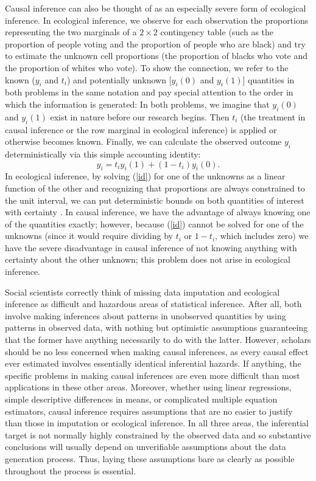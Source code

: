 \documentclass[11pt,titlepage]{article}
\begin{document}
Causal inference can also be thought of as an especially severe form
of ecological inference.  In ecological inference, we observe for each
observation the proportions representing the two marginals of a
$2\times 2$ contingency table (such as the proportion of people voting
and the proportion of people who are black) and try to estimate the
unknown cell proportions (the proportion of blacks who vote and the
proportion of whites who vote).  To show the connection, we refer to
the known ($y_i$ and $t_i$) and potentially unknown [$y_i(0)$ and
$y_i(1)$] quantities in both problems in the same notation and pay
special attention to the order in which the information is generated:
In both problems, we imagine that $y_i(0)$ and $y_i(1)$ exist in
nature before our research begins.  Then $t_i$ (the treatment in
causal inference or the row marginal in ecological inference) is
applied or otherwise becomes known.  Finally, we can calculate the
observed outcome $y_i$ deterministically via this simple accounting
identity:
\begin{equation}
  \label{id}
  y_i = t_iy_i(1) + (1-t_i)y_i(0).
\end{equation}
In ecological inference, by solving (\ref{id}) for one of the unknowns
as a linear function of the other and recognizing that proportions are
always constrained to the unit interval, we can put deterministic
bounds on both quantities of interest with certainty
\citep[][ch.5]{King97}.  In causal inference, we have the advantage of
always knowing one of the quantities exactly; however, because
(\ref{id}) cannot be solved for one of the unknowns (since it would
require dividing by $t_i$ or $1-t_i$, which includes zero) we have the
severe disadvantage in causal inference of not knowing anything with
certainty about the other unknown; this problem does not arise in
ecological inference.

Social scientists correctly think of missing data imputation and
ecological inference as difficult and hazardous areas of statistical
inference.  After all, both involve making inferences about patterns
in unobserved quantities by using patterns in observed data, with
nothing but optimistic assumptions guaranteeing that the former have
anything necessarily to do with the latter.  However, scholars should
be no less concerned when making causal inferences, as every causal
effect ever estimated involves essentially identical inferential
hazards.  If anything, the specific problems in making causal
inferences are even more difficult than most applications in these
other areas.  Moreover, whether using linear regressions, simple
descriptive differences in means, or complicated multiple equation
estimators, causal inference requires assumptions that are no easier
to justify than those in imputation or ecological inference.  In all
three areas, the inferential target is not normally highly constrained
by the observed data and so substantive conclusions will usually
depend on unverifiable assumptions about the data generation process.
Thus, laying these assumptions bare as clearly as possible throughout
the process is essential.
\end{document}
